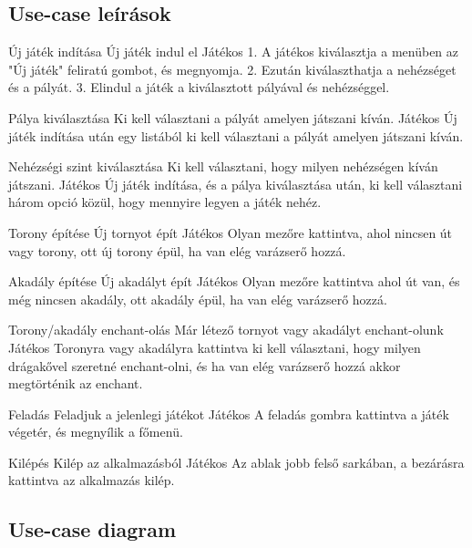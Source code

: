 \subsection{Use-case leírások}

\usecase
{Új játék indítása}
{Új játék indul el}
{Játékos}
{1. A játékos kiválasztja a menüben az "Új játék" feliratú gombot, és megnyomja.
2. Ezután kiválaszthatja  a nehézséget és a pályát. 
3. Elindul a játék a kiválasztott pályával és nehézséggel.}

\usecase
{Pálya kiválasztása}
{Ki kell választani a pályát amelyen játszani kíván.}
{Játékos}
{Új játék indítása után egy listából ki kell választani a pályát amelyen játszani kíván.}

\usecase
{Nehézségi szint kiválasztása}
{Ki kell választani, hogy milyen nehézségen kíván játszani.}
{Játékos}
{Új játék indítása, és a pálya kiválasztása után, ki kell választani három opció közül,
 hogy mennyire legyen a játék nehéz.}

\usecase
{Torony építése}
{Új tornyot épít}
{Játékos}
{Olyan mezőre kattintva, ahol nincsen út vagy torony, ott új torony épül, 
ha van elég varázserő hozzá.}

\usecase
{Akadály építése}
{Új akadályt épít}
{Játékos}
{Olyan mezőre kattintva ahol út van, és még nincsen akadály, ott akadály épül,
ha van elég varázserő hozzá.}

\usecase
{Torony/akadály enchant-olás}
{Már létező tornyot vagy akadályt enchant-olunk}
{Játékos}
{Toronyra vagy akadályra kattintva ki kell választani, hogy milyen drágakővel szeretné enchant-olni, 
és ha van elég varázserő hozzá akkor megtörténik az enchant.}

\usecase
{Feladás}
{Feladjuk a jelenlegi játékot}
{Játékos}
{A feladás gombra kattintva a játék végetér, és megnyílik a főmenü.}

\usecase
{Kilépés}
{Kilép az alkalmazásból}
{Játékos}
{Az ablak jobb felső sarkában, a bezárásra kattintva az alkalmazás kilép.}

\subsection{Use-case diagram}

